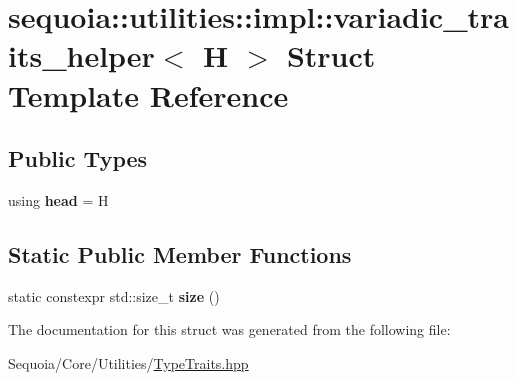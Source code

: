 \hypertarget{structsequoia_1_1utilities_1_1impl_1_1variadic__traits__helper_3_01_h_01_4}{}\section{sequoia\+::utilities\+::impl\+::variadic\+\_\+traits\+\_\+helper$<$ H $>$ Struct Template Reference}
\label{structsequoia_1_1utilities_1_1impl_1_1variadic__traits__helper_3_01_h_01_4}
\subsection*{Public Types}
\begin{DoxyCompactItemize}
\item 
\mbox{\label{structsequoia_1_1utilities_1_1impl_1_1variadic__traits__helper_3_01_h_01_4_abdfb591971dfdff268b50544c8c8c20f}} 
using {\bfseries head} = H
\end{DoxyCompactItemize}
\subsection*{Static Public Member Functions}
\begin{DoxyCompactItemize}
\item 
\mbox{\label{structsequoia_1_1utilities_1_1impl_1_1variadic__traits__helper_3_01_h_01_4_ab6349e48ceefc0fbd3d3ec842b28d2d8}} 
static constexpr std\+::size\+\_\+t {\bfseries size} ()
\end{DoxyCompactItemize}


The documentation for this struct was generated from the following file\+:\begin{DoxyCompactItemize}
\item 
Sequoia/\+Core/\+Utilities/\mbox{\hyperlink{_type_traits_8hpp}{Type\+Traits.\+hpp}}\end{DoxyCompactItemize}

